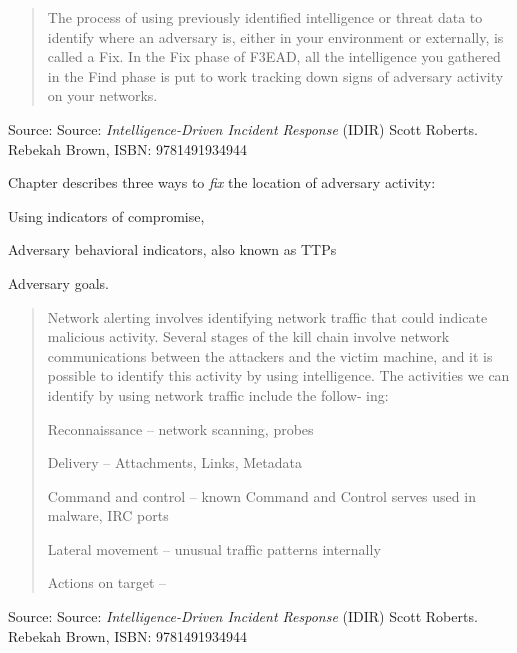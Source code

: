 \documentclass[Screen16to9,17pt]{foils}
\begin{document}







\begin{quote}
The process of using previously identified intelligence or threat data to identify where
an adversary is, either in your environment or externally, is called a Fix. In the Fix
phase of F3EAD, all the intelligence you gathered in the Find phase is put to work
tracking down signs of adversary activity on your networks.
\end{quote}
Source: Source: \emph{Intelligence-Driven Incident Response} (IDIR)
 Scott Roberts. Rebekah Brown, ISBN: 9781491934944

Chapter describes three ways to \emph{fix} the location of adversary activity:
\begin{list2}
\item Using indicators of compromise,
\item Adversary behavioral indicators, also known as TTPs
\item Adversary goals.
\end{list2}




\begin{quote}
Network alerting involves identifying network traffic that could indicate malicious
activity. Several stages of the kill chain involve network communications between the
attackers and the victim machine, and it is possible to identify this activity by using
intelligence. The activities we can identify by using network traffic include the follow‐
ing:
\begin{list2}
\item Reconnaissance -- network scanning, probes
\item Delivery -- Attachments, Links, Metadata
\item Command and control -- known Command and Control serves used in malware, IRC ports
\item Lateral movement -- unusual traffic patterns internally
\item Actions on target --
\end{list2}
\end{quote}
Source: Source: \emph{Intelligence-Driven Incident Response} (IDIR)
 Scott Roberts. Rebekah Brown, ISBN: 9781491934944
\end{document}
